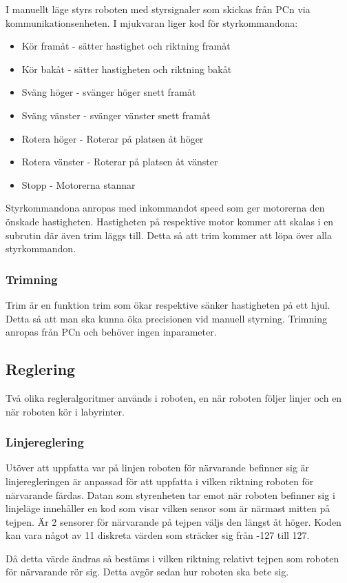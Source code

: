 I manuellt läge styrs roboten med styrsignaler som skickas från PCn via 
kommunikationsenheten. I mjukvaran liger kod för styrkommandona:
\begin{itemize}
\item Kör framåt - sätter hastighet och riktning framåt
\item Kör bakåt - sätter hastigheten och riktning bakåt
\item Sväng höger - svänger höger snett framåt
\item Sväng vänster - svänger vänster snett framåt
\item Rotera höger - Roterar på platsen åt höger
\item Rotera vänster - Roterar på platsen åt vänster
\item Stopp - Motorerna stannar
\end{itemize}
Styrkommandona anropas med inkommandot speed som ger motorerna den
önskade hastigheten. Hastigheten på respektive motor kommer att skalas i en subrutin
där även trim läggs till. Detta så att trim kommer att löpa över alla styrkommandon.

\subsubsection{Trimning}
Trim är en funktion trim som ökar respektive sänker hastigheten på ett hjul. 
Detta så att man ska kunna öka precisionen vid manuell styrning. Trimning 
anropas från PCn och behöver ingen inparameter.

\subsection{Reglering}
Två olika regleralgoritmer används i roboten, en när roboten följer linjer och
en när roboten kör i labyrinter.
\subsubsection{Linjereglering}
\label{sec:linjereglering}
Utöver att uppfatta var på linjen roboten för närvarande befinner sig är 
linjeregleringen är anpassad för att uppfatta i vilken riktning roboten för 
närvarande färdas. Datan som styrenheten tar emot när roboten befinner sig i 
linjeläge innehåller en kod som visar vilken sensor som är närmast mitten på 
tejpen. Är 2 sensorer för närvarande på tejpen väljs den längst åt höger. 
Koden kan vara något av 11 diskreta värden som sträcker sig från -127 till 127.

Då detta värde ändras så bestäms i vilken riktning relativt tejpen som 
roboten för närvarande rör sig. Detta avgör sedan hur roboten ska bete sig.

